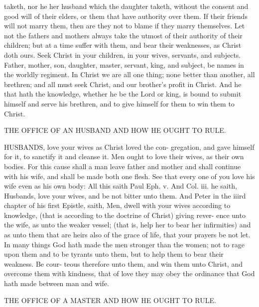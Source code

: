 \documentclass{custom}
\begin{document}
taketh, nor he her husband which the daughter taketh, 
without the consent and good will of their elders, or them 
that have authority over them. If their friends will not 
marry them, then are they not to blame if they marry 
themselves. Let not the fathers and mothers always take 
the utmost of their authority of their children; but at a 
time suffer with them, and bear their weaknesses, as Christ 
doth ours. Seek Christ in your children, in your wives, 
servants, and subjects. Father, mother, son, daughter, 
master, servant, king, and subject, be names in the worldly 
regiment. In Christ we are all one thing; none better 
than another, all brethren; and all must seek Christ, and 
our brother's profit in Christ. And he that hath the 
knowledge, whether he be the Lord or king, is bound to 
submit himself and serve his brethren, and to give himself 
for them to win them to Christ. 


THE OFFICE OF AN HUSBAND AND HOW HE 
OUGHT TO RULE. 

HUSBANDS, love your wives as Christ loved the con- 
gregation, and gave himself for it, to sanctify it and 
cleanse it. Men ought to love their wives, as their own 
bodies. For this cause shall a man leave father and mother 
and shall continue with his wife, and shall be made both 
one flesh. See that every one of you love his wife even as 
his own body: All this saith Paul Eph. v. And Col. iii. 
he saith, Husbands, love your wives, and be not bitter unto 
them. And Peter in the iiird chapter of his first Epistle, 
saith, Men, dwell with your wives according to knowledge, 
(that is according to the doctrine of Christ) giving rever- 
ence unto the wife, as unto the weaker vessel; (that is, 
help her to bear her infirmities) and as unto them that are 
heirs also of the grace of life, that your prayers be not let. 
In many things God hath made the men stronger than the 
women; not to rage upon them and to be tyrants unto them, 
but to help them to bear their weakness. Be cour- 
teous therefore unto them, and win them unto Christ, and 
overcome them with kindness, that of love they may obey 
the ordinance that God hath made between man and wife. 


THE OFFICE OF A MASTER AND HOW HE 
OUGHT TO RULE.
\end{document}
